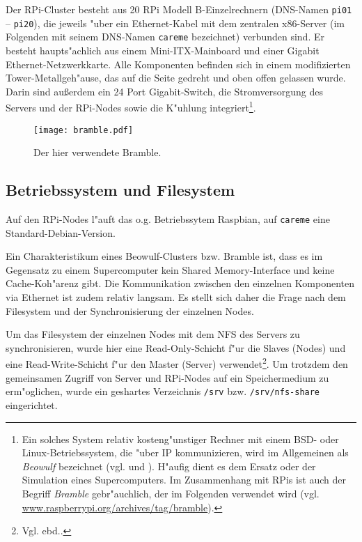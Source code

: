 Der RPi-Cluster besteht aus 20 RPi Modell B-Einzelrechnern (DNS-Namen \texttt{pi01} -- \texttt{pi20}), die jeweils "uber ein Ethernet-Kabel mit dem zentralen x86-Server (im Folgenden mit seinem DNS-Namen \texttt{careme} bezeichnet) verbunden sind. Er besteht haupts"achlich aus einem Mini-ITX-Mainboard und einer Gigabit Ethernet-Netzwerkkarte. Alle Komponenten befinden sich in einem modifizierten Tower-Metallgeh"ause, das auf die Seite gedreht und oben offen gelassen wurde. Darin sind au\ss erdem ein 24 Port Gigabit-Switch, die Stromversorgung des Servers und der RPi-Nodes sowie die K"uhlung integriert\footnote{Ein solches System relativ kosteng"unstiger Rechner mit einem BSD- oder Linux-Betriebssystem, die "uber IP kommunizieren, wird im Allgemeinen als \textit{Beowulf} bezeichnet (vgl. \cite{kie01} und \cite{kli13}). H"aufig dient es dem Ersatz oder der Simulation eines Supercomputers. Im Zusammenhang mit RPis ist auch der Begriff \textit{Bramble} gebr"auchlich, der im Folgenden verwendet wird (vgl. \url{www.raspberrypi.org/archives/tag/bramble}).}. 
\begin{figure}[htb]
	\centering
	\texttt{[image: bramble.pdf]}\\ 
	\caption{Der hier verwendete Bramble.}\label{fig:Bramble}
\end{figure}

\subsection{Betriebssystem und Filesystem}\label{Bramble Systemarchitektur} 

Auf den RPi-Nodes l"auft das o.g. Betriebssytem Raspbian, auf \texttt{careme} eine Standard-Debian-Version. 

Ein Charakteristikum eines Beowulf-Clusters bzw. Bramble ist, dass es im Gegensatz zu einem Supercomputer kein Shared Memory-Interface und keine Cache-Koh"arenz gibt. Die Kommunikation zwischen den einzelnen Komponenten via Ethernet ist zudem relativ langsam. Es stellt sich daher die Frage nach dem Filesystem und der Synchronisierung der einzelnen Nodes. 

Um das Filesystem der einzelnen Nodes mit dem NFS des Servers zu synchronisieren, wurde hier eine Read-Only-Schicht f"ur die Slaves (Nodes) und eine Read-Write-Schicht f"ur den Master (Server) verwendet\footnote{Vgl. ebd..}. Um trotzdem den gemeinsamen Zugriff von Server und RPi-Nodes auf ein Speichermedium zu erm"oglichen, wurde ein geshartes Verzeichnis \texttt{/srv} bzw. \texttt{/srv/nfs-share} eingerichtet. 


